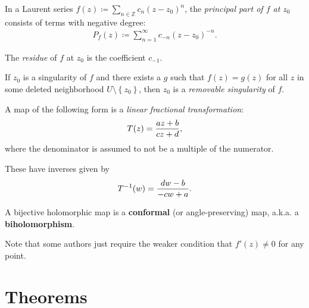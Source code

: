\begin{definition}

In a Laurent series
\(f(z) \coloneqq\sum_{n\in {\mathbb{Z}}} c_n (z-z_0)^n\), the
\emph{principal part of \(f\) at \(z_0\)} consists of terms with
negative degree:
\begin{align*}  
P_f(z) \coloneqq\sum_{n=1}^\infty c_{-n}(z-z_0)^{-n}
.\end{align*}

The \emph{residue} of \(f\) at \(z_0\) is the coefficient \(c_{-1}\).

\end{definition}

\begin{definition}

If \(z_0\) is a singularity of \(f\) and there exists a \(g\) such that
\(f(z) = g(z)\) for all \(z\) in some deleted neighborhood
\(U\setminus\left\{{z_0}\right\}\), then \(z_0\) is a \emph{removable
singularity} of \(f\).

\end{definition}

\begin{definition}

A map of the following form is a \emph{linear fractional
transformation}:
\begin{align*}  
T(z) = {az + b \over cz + d}
,\end{align*}
where the denominator is assumed to not be a multiple of the numerator.

These have inverses given by
\begin{align*}  
T^{-1}(w) = {dw-b \over -cw + a}
.\end{align*}

\end{definition}

\begin{definition}

A bijective holomorphic map is a \textbf{conformal} (or
angle-preserving) map, a.k.a. a \textbf{biholomorphism}.

Note that some authors just require the weaker condition that
\(f'(z) \neq 0\) for any point.

\end{definition}

\hypertarget{theorems}{%
\section{Theorems}\label{theorems}}

